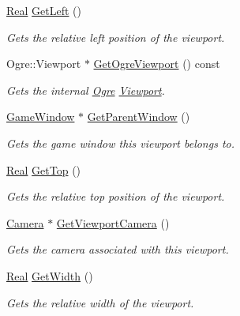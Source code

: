 \begin{DoxyCompactItemize}
\hyperlink{namespaceMezzanine_a726731b1a7df72bf3583e4a97282c6f6}{Real} \hyperlink{classMezzanine_1_1Viewport_a593954543d661785f8075b6d1bea9b0d}{GetLeft} ()
\begin{DoxyCompactList}\small\item\em Gets the relative left position of the viewport. \item\end{DoxyCompactList}\item 
Ogre::Viewport $\ast$ \hyperlink{classMezzanine_1_1Viewport_a54af912f78ca05aaab8dcea5465e61b9}{GetOgreViewport} () const 
\begin{DoxyCompactList}\small\item\em Gets the internal \hyperlink{namespaceOgre}{Ogre} \hyperlink{classMezzanine_1_1Viewport}{Viewport}. \item\end{DoxyCompactList}\item 
\hyperlink{classMezzanine_1_1GameWindow}{GameWindow} $\ast$ \hyperlink{classMezzanine_1_1Viewport_a3da26dc1b30d984f1801b64e1052ad55}{GetParentWindow} ()
\begin{DoxyCompactList}\small\item\em Gets the game window this viewport belongs to. \item\end{DoxyCompactList}\item 
\hyperlink{namespaceMezzanine_a726731b1a7df72bf3583e4a97282c6f6}{Real} \hyperlink{classMezzanine_1_1Viewport_a0071bf5d6c9aaf4abb94179485d4fedd}{GetTop} ()
\begin{DoxyCompactList}\small\item\em Gets the relative top position of the viewport. \item\end{DoxyCompactList}\item 
\hyperlink{classMezzanine_1_1Camera}{Camera} $\ast$ \hyperlink{classMezzanine_1_1Viewport_a4665724d7b82f936e4c6b0e23d405c25}{GetViewportCamera} ()
\begin{DoxyCompactList}\small\item\em Gets the camera associated with this viewport. \item\end{DoxyCompactList}\item 
\hyperlink{namespaceMezzanine_a726731b1a7df72bf3583e4a97282c6f6}{Real} \hyperlink{classMezzanine_1_1Viewport_ad3749dc4c31a76ac82a4a4641e97647b}{GetWidth} ()
\begin{DoxyCompactList}\small\item\em Gets the relative width of the viewport. \item\end{DoxyCompactList}\item 

\end{DoxyCompactItemize}
